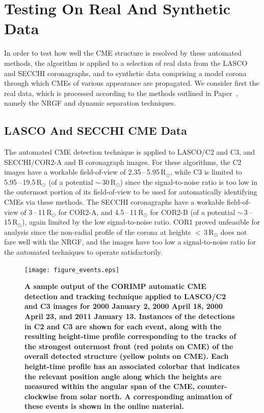 \documentclass[preprint2]{aastex}
\newcommand{\RNum}[1]{\uppercase\expandafter{\romannumeral #1\relax}}
\begin{document}
\section{Testing On Real And Synthetic Data}
\label{sect_data}

In order to test how well the CME structure is resolved by these automated methods, the algorithm is applied to a selection of real data from the LASCO and SECCHI coronagraphs, and to synthetic data comprising a model corona through which CMEs of various appearance are propagated. We consider first the real data, which is processed according to the methods outlined in Paper~\RNum{1}, namely the NRGF and dynamic separation techniques.


\subsection{LASCO And SECCHI CME Data}
\label{subsect_data}

The automated CME detection technique is applied to LASCO/C2 and C3, and SECCHI/COR2-A and B coronagraph images. For these algorithms, the C2 images have a workable field-of-view of 2.35\,--\,5.95\,R$_{\odot}$, while C3 is limited to 5.95\,--\,19.5\,R$_{\odot}$  (of a potential $\sim$\,30\,R$_{\odot}$) since the signal-to-noise ratio is too low in the outermost portion of its field-of-view to be used for automatically identifying CMEs via these methods. The SECCHI coronagraphs have a workable field-of-view of 3\,--\,11\,R$_{\odot}$ for COR2-A, and 4.5\,--\,11\,R$_{\odot}$ for COR2-B (of a potential $\sim$\,3\,--\,15\,R$_{\odot}$), again limited by the low signal-to-noise ratio. COR1 proved unfeasible for analysis since the non-radial profile of the corona at heights $<$\,3\,R$_\odot$ does not fare well with the NRGF, and the images have too low a signal-to-noise ratio for the automated techniques to operate satisfactorily.

\begin{figure}[!p]
\centerline{\texttt{[image: figure\_events.eps]}}
\caption{{\bf A sample output of the CORIMP automatic CME detection and tracking technique applied to LASCO/C2 and C3 images for 2000 January 2, 2000 April 18, 2000 April 23, and 2011 January 13. Instances of the detections in C2 and C3 are shown for each event, along with the resulting height-time profile corresponding to the tracks of the strongest outermost front (red points on CME) of the overall detected structure (yellow points on CME). Each height-time profile has an associated colorbar that indicates the relevant position angle along which the heights are measured within the angular span of the CME, counter-clockwise from solar north. A corresponding animation of these events is shown in the online material.}}
\label{figure_events}
\end{figure}
\end{document}
